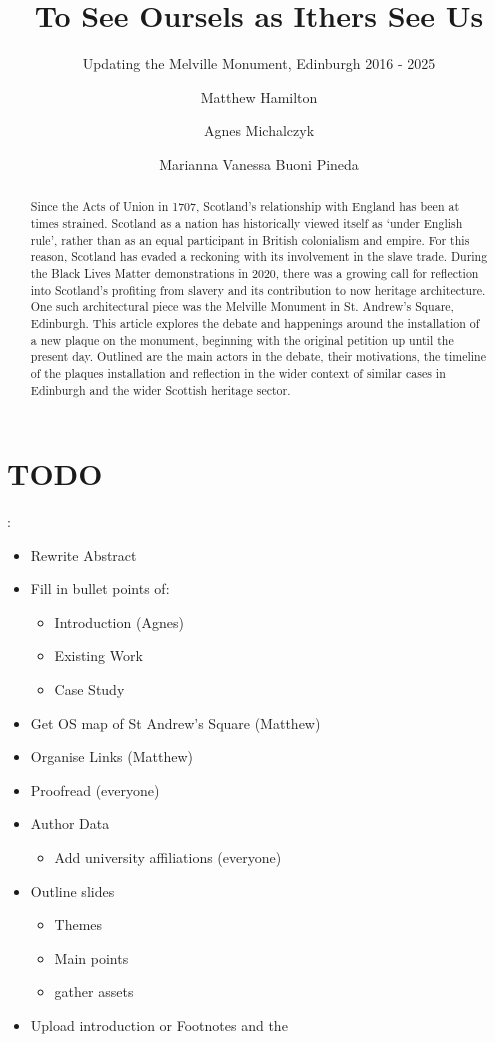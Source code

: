 \documentclass{scrartcl}
\title{To See Oursels as Ithers See Us}
\subtitle{Updating the Melville Monument, Edinburgh 2016 - 2025}
\author[1]{Matthew Hamilton}
\author[2]{Agnes Michalczyk}
\author[3]{Marianna Vanessa Buoni Pineda}
\affil[1]{Università di Bologna}
\affil[2]{University of}
\affil[3]{University of}
\date{}
\begin{document}
\maketitle

\begin{abstract}
Since the Acts of Union in 1707, Scotland’s relationship with England has been at times strained. 
Scotland as a nation has historically viewed itself as ‘under English rule’, rather than as an equal participant in British colonialism and empire. 
For this reason, Scotland has evaded a reckoning with its involvement in the slave trade. 
During the Black Lives Matter demonstrations in 2020, there was a growing call for reflection into Scotland’s profiting from slavery and its contribution to now heritage architecture. 
One such architectural piece was the Melville Monument in St. Andrew's Square, Edinburgh. 
This article explores the debate and happenings around the installation of a new plaque on the monument, beginning with the original petition up until the present day.
Outlined are the main actors in the debate, their motivations, the timeline of the plaques installation and reflection in the wider context of similar cases in Edinburgh and the wider Scottish heritage sector.
\end{abstract}

\section{TODO}:

\begin{itemize}
    \item Rewrite Abstract
    \item Fill in bullet points of:
    \begin{itemize}
        \item Introduction (Agnes)
        \item Existing Work
        \item Case Study
    \end{itemize}
    \item Get OS map of St Andrew's Square (Matthew)
    \item Organise Links (Matthew)
    \item Proofread (everyone)
    \item Author Data
    \begin{itemize}
        \item Add university affiliations (everyone)
    \end{itemize}
    \item Outline slides
    \begin{itemize}
        \item Themes
        \item Main points
        \item gather assets
    \end{itemize}
    \item Upload introduction or Footnotes and the
\end{itemize}
\end{document}
